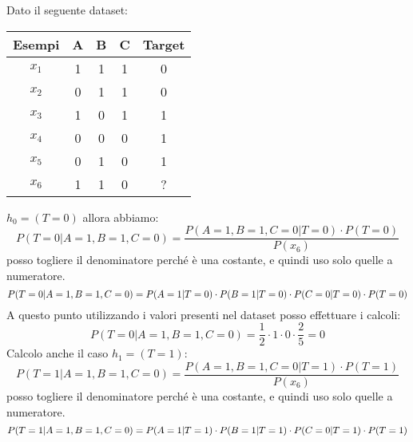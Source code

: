 \begin{esempio}
    Dato il seguente dataset:
    \begin{table}[!ht]
        \centering
        \begin{tabular}{c|ccc|c}
            Esempi & A & B & C & Target \\ \hline
            $x_1$  & 1 & 1 & 1 & 0      \\ \hline
            $x_2$  & 0 & 1 & 1 & 0      \\ \hline
            $x_3$  & 1 & 0 & 1 & 1      \\ \hline
            $x_4$  & 0 & 0 & 0 & 1      \\ \hline
            $x_5$  & 0 & 1 & 0 & 1      \\ \hline
            $x_6$  & 1 & 1 & 0 & ?      \\
        \end{tabular}
    \end{table}
    $h_0 = (T = 0)$ allora abbiamo:
    \begin{equation}
        P(T = 0 | A = 1, B = 1, C = 0) = \frac{P(A = 1, B = 1, C = 0 | T = 0)
            \cdot P(T = 0)}{P(x_6)}
    \end{equation}
    posso togliere il denominatore perché è una costante, e quindi uso solo
    quelle a numeratore.
    \begin{equation}
        P(T = 0 | A = 1, B = 1, C = 0) = \\ P(A = 1 | T = 0) \cdot P(B = 1 | T = 0)
        \cdot P(C = 0 | T = 0) \cdot P(T = 0)
    \end{equation}
    A questo punto utilizzando i valori presenti nel dataset posso effettuare i calcoli:
    \begin{equation}
        P(T = 0 | A = 1, B = 1, C = 0) = \frac{1}{2} \cdot 1 \cdot 0 \cdot \frac{2}{5} = 0
    \end{equation}
    Calcolo anche il caso $h_1 = (T = 1)$:
    \begin{equation}
        P(T = 1 | A = 1, B = 1, C = 0) = \frac{P(A = 1, B = 1, C = 0 | T = 1)
            \cdot P(T = 1)}{P(x_6)}
    \end{equation}
    posso togliere il denominatore perché è una costante, e quindi uso solo
    quelle a numeratore.
    \begin{equation}
        P(T = 1 | A = 1, B = 1, C = 0) = \\ P(A = 1 | T = 1) \cdot P(B = 1 | T = 1)
        \cdot P(C = 0 | T = 1) \cdot P(T = 1)
    \end{equation}

\end{esempio}
